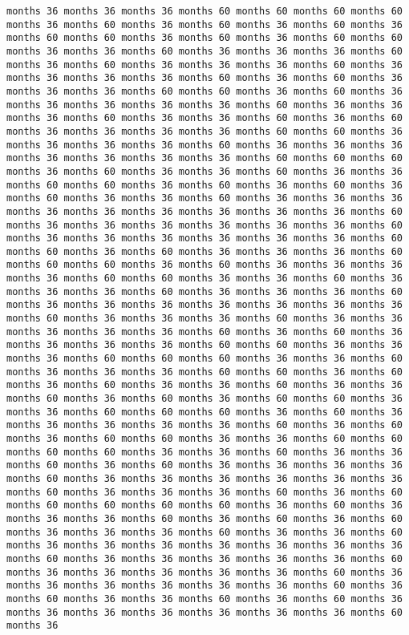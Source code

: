 \documentclass[11pt]{article}
\begin{document}
\begin{Verbatim}[commandchars=\\\{\}, frame=single, framerule=2mm, rulecolor=\color{outerrorbackground}]
months 36 months 36 months 36 months 60 months 60 months 60 months 60 months 36 months 60 months 36 months 60 months 36 months 60 months 36 months 60 months 60 months 36 months 60 months 36 months 60 months 60 months 36 months 36 months 60 months 36 months 36 months 36 months 60 months 36 months 60 months 36 months 36 months 36 months 60 months 36 months 36 months 36 months 36 months 60 months 36 months 60 months 36 months 36 months 36 months 60 months 60 months 36 months 60 months 36 months 36 months 36 months 36 months 36 months 60 months 36 months 36 months 36 months 60 months 36 months 36 months 60 months 36 months 60 months 36 months 36 months 36 months 36 months 60 months 60 months 36 months 36 months 36 months 36 months 60 months 36 months 36 months 36 months 36 months 36 months 36 months 36 months 60 months 60 months 60 months 36 months 60 months 36 months 36 months 60 months 36 months 36 months 60 months 60 months 36 months 60 months 36 months 60 months 36 months 60 months 36 months 36 months 60 months 36 months 36 months 36 months 36 months 36 months 36 months 36 months 36 months 36 months 60 months 36 months 36 months 36 months 36 months 36 months 36 months 60 months 36 months 36 months 36 months 36 months 36 months 36 months 60 months 60 months 36 months 60 months 36 months 36 months 36 months 60 months 60 months 60 months 36 months 60 months 36 months 36 months 36 months 36 months 60 months 60 months 36 months 36 months 60 months 36 months 36 months 36 months 60 months 36 months 36 months 36 months 60 months 36 months 36 months 36 months 36 months 36 months 36 months 36 months 60 months 36 months 36 months 36 months 60 months 36 months 36 months 36 months 36 months 36 months 60 months 36 months 60 months 36 months 36 months 36 months 36 months 60 months 60 months 36 months 36 months 36 months 60 months 60 months 60 months 36 months 36 months 60 months 36 months 36 months 36 months 60 months 60 months 36 months 60 months 36 months 60 months 36 months 36 months 60 months 36 months 36 months 60 months 36 months 60 months 36 months 60 months 60 months 36 months 36 months 60 months 60 months 60 months 36 months 60 months 36 months 36 months 36 months 36 months 36 months 60 months 36 months 60 months 36 months 60 months 60 months 36 months 36 months 60 months 60 months 60 months 60 months 36 months 36 months 60 months 36 months 36 months 60 months 36 months 60 months 36 months 36 months 36 months 36 months 60 months 36 months 36 months 36 months 36 months 36 months 36 months 60 months 36 months 36 months 36 months 60 months 36 months 60 months 60 months 60 months 60 months 60 months 36 months 60 months 36 months 36 months 36 months 60 months 36 months 60 months 36 months 60 months 36 months 36 months 36 months 60 months 36 months 36 months 60 months 36 months 36 months 36 months 36 months 36 months 36 months 36 months 60 months 36 months 36 months 36 months 36 months 36 months 60 months 36 months 36 months 36 months 36 months 36 months 60 months 36 months 36 months 36 months 36 months 36 months 36 months 60 months 36 months 60 months 36 months 36 months 60 months 36 months 60 months 36 months 36 months 36 months 36 months 36 months 36 months 36 months 60 months 36 
\end{Verbatim}
\end{document}
